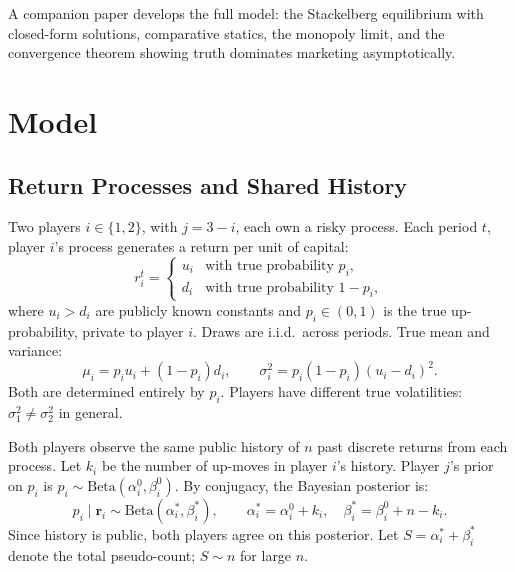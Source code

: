 \documentclass[12pt,a4paper]{article}
\newcommand{\1}{\mathbf{1}}
\begin{document}
A companion paper \citep{Rana2025} develops the full model: the
Stackelberg equilibrium with closed-form solutions, comparative
statics, the monopoly limit, and the convergence theorem showing
truth dominates marketing asymptotically.

\section{Model}
\label{sec:model}

\subsection{Return Processes and Shared History}

Two players $i \in \{1,2\}$, with $j = 3-i$, each own a risky process.
Each period $t$, player $i$'s process generates a return per unit of
capital:
\begin{equation}
  r_i^t =
  \begin{cases}
    u_i & \text{with true probability } p_i,\\
    d_i & \text{with true probability } 1-p_i,
  \end{cases}
  \label{eq:returns}
\end{equation}
where $u_i > d_i$ are publicly known constants and
$p_i \in (0,1)$ is the true up-probability, private to player $i$.
Draws are i.i.d.\ across periods. True mean and variance:
\begin{equation}
  \mu_i = p_i u_i + (1-p_i)d_i,
  \qquad
  \sigma_i^2 = p_i(1-p_i)(u_i-d_i)^2.
  \label{eq:true_moments}
\end{equation}
Both are determined entirely by $p_i$. Players have different true
volatilities: $\sigma_1^2 \neq \sigma_2^2$ in general.

Both players observe the same public history of $n$ past discrete
returns from each process. Let $k_i$ be the number of up-moves in
player $i$'s history. Player $j$'s prior on $p_i$ is
$p_i \sim \mathrm{Beta}(\alpha_i^0, \beta_i^0)$. By conjugacy,
the Bayesian posterior is:
\begin{equation}
  p_i \mid \mathbf{r}_i \sim \mathrm{Beta}(\alpha_i^*, \beta_i^*),
  \qquad
  \alpha_i^* = \alpha_i^0 + k_i, \quad
  \beta_i^* = \beta_i^0 + n - k_i.
  \label{eq:posterior}
\end{equation}
Since history is public, both players agree on this posterior. Let
$S = \alpha_i^* + \beta_i^*$ denote the total pseudo-count;
$S \sim n$ for large $n$.
\end{document}
